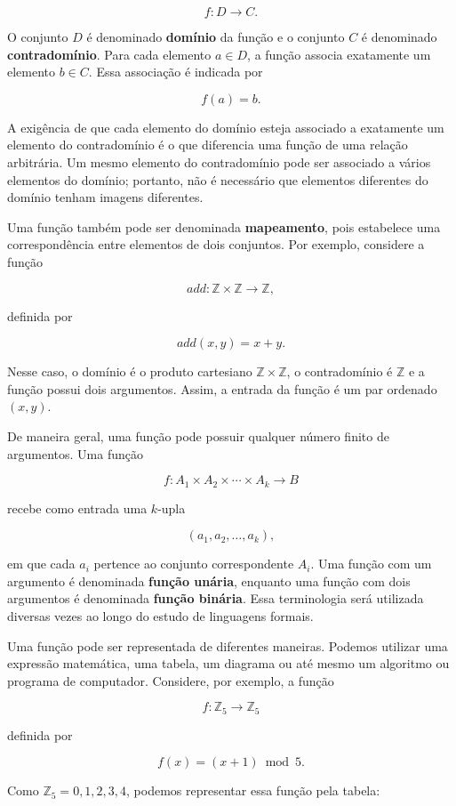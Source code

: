 \documentclass[
  brazilian,
  letterpaper,
]{book}
\theoremstyle{plain}
\theoremstyle{definition}
\theoremstyle{remark}
\begin{document}
\[
f:D\rightarrow C.
\]

O conjunto \(D\) é denominado \textbf{domínio} da função e o conjunto
\(C\) é denominado \textbf{contradomínio}. Para cada elemento
\(a\in D\), a função associa exatamente um elemento \(b\in C\). Essa
associação é indicada por

\[
f(a)=b.
\]

A exigência de que cada elemento do domínio esteja associado a
exatamente um elemento do contradomínio é o que diferencia uma função de
uma relação arbitrária. Um mesmo elemento do contradomínio pode ser
associado a vários elementos do domínio; portanto, não é necessário que
elementos diferentes do domínio tenham imagens diferentes.

Uma função também pode ser denominada \textbf{mapeamento}, pois
estabelece uma correspondência entre elementos de dois conjuntos. Por
exemplo, considere a função

\[
add:\mathbb{Z}\times\mathbb{Z}\rightarrow\mathbb{Z},
\]

definida por

\[
add(x,y)=x+y.
\]

Nesse caso, o domínio é o produto cartesiano
\(\mathbb{Z}\times\mathbb{Z}\), o contradomínio é \(\mathbb{Z}\) e a
função possui dois argumentos. Assim, a entrada da função é um par
ordenado \((x,y)\).

De maneira geral, uma função pode possuir qualquer número finito de
argumentos. Uma função

\[
f:A_1\times A_2\times\cdots\times A_k\rightarrow B
\]

recebe como entrada uma \(k\)-upla

\[
(a_1,a_2,\ldots,a_k),
\]

em que cada \(a_i\) pertence ao conjunto correspondente \(A_i\). Uma
função com um argumento é denominada \textbf{função unária}, enquanto
uma função com dois argumentos é denominada \textbf{função binária}.
Essa terminologia será utilizada diversas vezes ao longo do estudo de
linguagens formais.

Uma função pode ser representada de diferentes maneiras. Podemos
utilizar uma expressão matemática, uma tabela, um diagrama ou até mesmo
um algoritmo ou programa de computador. Considere, por exemplo, a função

\[
f:\mathbb{Z}_5\rightarrow\mathbb{Z}_5
\]

definida por

\[
f(x)=(x+1)\bmod 5.
\]

Como \(\mathbb{Z}_5={0,1,2,3,4}\), podemos representar essa função pela
tabela:
\end{document}
